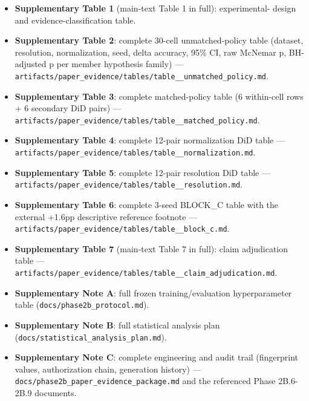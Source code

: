 \begin{itemize}
  \item \textbf{Supplementary Table 1} (main-text Table 1 in full): experimental- design and evidence-classification table.
  \item \textbf{Supplementary Table 2}: complete 30-cell unmatched-policy table (dataset, resolution, normalization, seed, delta accuracy, 95\% CI, raw McNemar p, BH-adjusted p per member hypothesis family) --- \texttt{artifacts/\allowbreak paper\_\allowbreak evidence/\allowbreak tables/\allowbreak table\_\_\allowbreak unmatched\_\allowbreak policy.md}.
  \item \textbf{Supplementary Table 3}: complete matched-policy table (6 within-cell rows + 6 secondary DiD pairs) --- \texttt{artifacts/\allowbreak paper\_\allowbreak evidence/\allowbreak tables/\allowbreak table\_\_\allowbreak matched\_\allowbreak policy.md}.
  \item \textbf{Supplementary Table 4}: complete 12-pair normalization DiD table --- \texttt{artifacts/\allowbreak paper\_\allowbreak evidence/\allowbreak tables/\allowbreak table\_\_\allowbreak normalization.md}.
  \item \textbf{Supplementary Table 5}: complete 12-pair resolution DiD table --- \texttt{artifacts/\allowbreak paper\_\allowbreak evidence/\allowbreak tables/\allowbreak table\_\_\allowbreak resolution.md}.
  \item \textbf{Supplementary Table 6}: complete 3-seed BLOCK\_C table with the external +1.6pp descriptive reference footnote --- \texttt{artifacts/\allowbreak paper\_\allowbreak evidence/\allowbreak tables/\allowbreak table\_\_\allowbreak block\_\allowbreak c.md}.
  \item \textbf{Supplementary Table 7} (main-text Table 7 in full): claim adjudication table --- \texttt{artifacts/\allowbreak paper\_\allowbreak evidence/\allowbreak tables/\allowbreak table\_\_\allowbreak claim\_\allowbreak adjudication.md}.
  \item \textbf{Supplementary Note A}: full frozen training/evaluation hyperparameter table (\texttt{docs/\allowbreak phase2b\_\allowbreak protocol.md}).
  \item \textbf{Supplementary Note B}: full statistical analysis plan (\texttt{docs/\allowbreak statistical\_\allowbreak analysis\_\allowbreak plan.md}).
  \item \textbf{Supplementary Note C}: complete engineering and audit trail (fingerprint values, authorization chain, generation history) --- \texttt{docs/\allowbreak phase2b\_\allowbreak paper\_\allowbreak evidence\_\allowbreak package.md} and the referenced Phase 2B.6-2B.9 documents.

\end{itemize}
